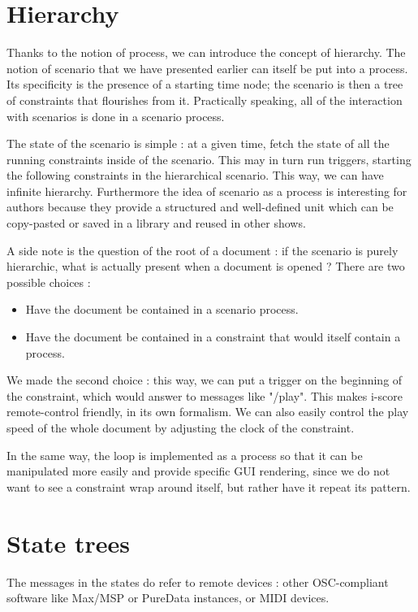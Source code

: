 \documentclass{sigchi}
\begin{document}

\section{Hierarchy}
Thanks to the notion of process, we can introduce the concept of hierarchy. The notion of scenario that we have presented earlier can itself be put into a process. Its specificity is the presence of a starting time node; the scenario is then a tree of constraints that flourishes from it. Practically speaking, all of the interaction with scenarios is done in a scenario process.

The state of the scenario is simple : at a given time, fetch the state of all the running constraints inside of the scenario. This may in turn run triggers, starting the following constraints in the hierarchical scenario. This way, we can have infinite hierarchy.
Furthermore the idea of scenario as a process is interesting for authors because they provide a structured and well-defined unit which can be copy-pasted or saved in a library and reused in other shows.

A side note is the question of the root of a document : if the scenario is purely hierarchic, what is actually present when a document is opened ? There are two possible choices : 
\begin{itemize}
    \item Have the document be contained in a scenario process.
    \item Have the document be contained in a constraint that would itself contain a process. 
\end{itemize}
    
We made the second choice : this way, we can put a trigger on the beginning of the constraint, which would answer to messages like "/play". This makes i-score remote-control friendly, in its own formalism.
We can also easily control the play speed of the whole document by adjusting the clock of the constraint.
    
In the same way, the loop is implemented as a process so that it can be manipulated more easily and provide specific GUI rendering, since we do not want to see a constraint wrap around itself, but rather have it repeat its pattern.

\section{State trees}
The messages in the states do refer to remote devices : other OSC-compliant software like Max/MSP or PureData instances, or MIDI devices. 
\end{document}
